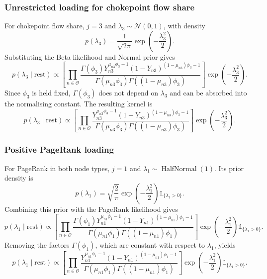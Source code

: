 \documentclass[pdftex,12pt,openright,a4paper,oneside]{book}
\begin{document}
\subsubsection{Unrestricted loading for chokepoint flow share}

For chokepoint flow share, $j=3$ and
$\lambda_3\sim\mathcal{N}(0,1)$, with density
\begin{equation*}
p(\lambda_3)=
\frac{1}{\sqrt{2\pi}}
\exp\!\left(-\frac{\lambda_3^2}{2}\right).
\end{equation*}
Substituting the Beta likelihood and Normal prior gives
\begin{equation*}
p(\lambda_3\mid\mathrm{rest})
\propto 
\left[
\prod_{n\in\mathcal{O}}
\frac{
\Gamma(\phi_3)
Y_{n3}^{\mu_{n3}\phi_3-1}
(1-Y_{n3})^{(1-\mu_{n3})\phi_3-1}
}{
\Gamma(\mu_{n3}\phi_3)
\Gamma((1-\mu_{n3})\phi_3)
}
\right]
\exp\!\left(-\frac{\lambda_3^2}{2}\right).
\end{equation*}
Since $\phi_3$ is held fixed, $\Gamma(\phi_3)$
does not depend on $\lambda_3$ and can be absorbed
into the normalising constant. The resulting kernel is
\begin{equation*}
p(\lambda_3\mid\mathrm{rest})
\propto
\left[
\prod_{n\in\mathcal{O}}
\frac{
Y_{n3}^{\mu_{n3}\phi_3-1}
(1-Y_{n3})^{(1-\mu_{n3})\phi_3-1}
}{
\Gamma(\mu_{n3}\phi_3)
\Gamma((1-\mu_{n3})\phi_3)
}
\right]
\exp\!\left(-\frac{\lambda_3^2}{2}\right).
\end{equation*}

\subsubsection{Positive PageRank loading}

For PageRank in both node types, $j=1$ and
$\lambda_1\sim\operatorname{HalfNormal}(1)$.
Its prior density is
\begin{equation*}
p(\lambda_1)
=
\sqrt{\frac{2}{\pi}}
\exp\!\left(-\frac{\lambda_1^2}{2}\right)
\mathds{1}_{\{\lambda_1>0\}}.
\end{equation*}
Combining this prior with the PageRank likelihood gives
\begin{equation*}
p(\lambda_1\mid\mathrm{rest})
\propto 
\left[
\prod_{n\in\mathcal{O}}
\frac{
\Gamma(\phi_1)
Y_{n1}^{\mu_{n1}\phi_1-1}
(1-Y_{n1})^{(1-\mu_{n1})\phi_1-1}
}{
\Gamma(\mu_{n1}\phi_1)
\Gamma((1-\mu_{n1})\phi_1)
}
\right]
\exp\!\left(-\frac{\lambda_1^2}{2}\right)
\mathds{1}_{\{\lambda_1>0\}}.
\end{equation*}
Removing the factors $\Gamma(\phi_1)$, which are
constant with respect to $\lambda_1$, yields
\begin{equation*}
p(\lambda_1\mid\mathrm{rest})
\propto 
\left[
\prod_{n\in\mathcal{O}}
\frac{
Y_{n1}^{\mu_{n1}\phi_1-1}
(1-Y_{n1})^{(1-\mu_{n1})\phi_1-1}
}{
\Gamma(\mu_{n1}\phi_1)
\Gamma((1-\mu_{n1})\phi_1)
}
\right]
\exp\!\left(-\frac{\lambda_1^2}{2}\right)
\mathds{1}_{\{\lambda_1>0\}}.
\end{equation*}
\end{document}
